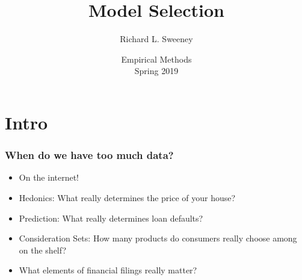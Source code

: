 

\title{Model Selection}
\author{Richard L. Sweeney}
\date{Empirical Methods \\ Spring 2019}




\begin{frame}
    \titlepage
\end{frame}

\begin{frame}
    \tableofcontents  
\end{frame}
    
   
\section{Intro}


\begin{frame}
\frametitle{When do we have too much data?}
\begin{itemize}
\item On the internet!
\item Hedonics: What really determines the price of your house?
\item Prediction: What really determines loan defaults?
\item Consideration Sets: How many products do consumers really choose among on the shelf?
\item What elements of financial filings really matter?
\end{itemize}

\end{frame}


